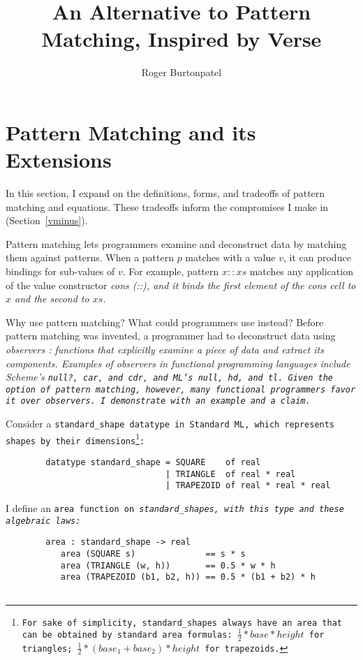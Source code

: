 \documentclass[manuscript,screen,review, 12pt, nonacm]{acmart}
\title{An Alternative to Pattern Matching, Inspired by Verse}
\author{Roger Burtonpatel}
\affiliation{%
  \institution{Tufts University}
  \streetaddress{419 Boston Ave}
  \city{Medford}
  \state{Massachusetts}
  \country{USA}
  \postcode{02155}
}
\begin{document}
\section{Pattern Matching and its Extensions}
\label{pmandextensions}

In this section, I expand on the definitions, forms, and tradeoffs of pattern
matching and equations. These tradeoffs inform the compromises I make in
\VMinus (Section~\ref{vminus}).



Pattern matching lets programmers examine and deconstruct data by matching them
against patterns. When a pattern $p$ matches with a value $v$, it can produce
bindings for sub-values of $v$. For example, pattern $x::xs$ matches any 
application of the value constructor \it{cons} (\it{::}), and it binds the first 
element of the cons cell to $x$ and the second to $xs$. 

Why use pattern matching? What could programmers use instead? Before pattern
matching was invented, a programmer had to deconstruct data using \it{observers}
\citep{liskov:abstraction}: functions that explicitly examine a piece of data
and extract its components. Examples of observers in functional programming
languages include Scheme's \tt{null?}, \tt{car}, and \tt{cdr}, and ML's
\tt{null}, \tt{hd}, and \tt{tl}. Given the option of pattern matching, however,
many functional programmers favor it over observers. I demonstrate with an
example and a claim. 

Consider a \tt{standard\_shape} datatype in Standard ML, which represents shapes
by their dimensions\footnote{For sake of simplicity, \tt{standard\_shape}s
always have an area that can be obtained by standard area formulas: $\frac{1}{2}
* base * height$ for triangles; $\frac{1}{2} * (base_{1} + base_{2}) * height$
for trapezoids.}: 

\medskip 
\begin{minipage}[t]{\textwidth}
    \begin{verbatim}
        datatype standard_shape = SQUARE    of real 
                                | TRIANGLE  of real * real 
                                | TRAPEZOID of real * real * real
\end{verbatim}
\end{minipage}
\medskip 

I define an \tt{area} function on \it{standard\_shape}s, with this type and these
algebraic laws: 

\medskip 
\begin{minipage}[t]{\textwidth}
    \begin{verbatim}
        area : standard_shape -> real 
           area (SQUARE s)              == s * s 
           area (TRIANGLE (w, h))       == 0.5 * w * h
           area (TRAPEZOID (b1, b2, h)) == 0.5 * (b1 + b2) * h
        
\end{verbatim}
\end{minipage}
\medskip 
\end{document}
